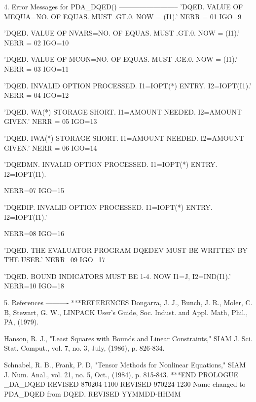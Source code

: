 \documentclass[11pt,twoside,nolof]{starlink}
\begin{document}
\begin{terminalv}
  4. Error Messages for PDA_DQED()
     --------------------------
   'DQED. VALUE OF MEQUA=NO. OF EQUAS. MUST .GT.0. NOW = (I1).'
   NERR = 01
   IGO=9

  'DQED. VALUE OF NVARS=NO. OF EQUAS. MUST .GT.0. NOW = (I1).'
   NERR = 02
   IGO=10

  'DQED. VALUE OF MCON=NO. OF EQUAS. MUST .GE.0. NOW = (I1).'
   NERR = 03
   IGO=11

  'DQED. INVALID OPTION PROCESSED. I1=IOPT(*) ENTRY.   I2=IOPT(I1).'
   NERR = 04
   IGO=12

  'DQED. WA(*) STORAGE SHORT. I1=AMOUNT NEEDED. I2=AMOUNT GIVEN.'
   NERR = 05
   IGO=13

  'DQED. IWA(*) STORAGE SHORT. I1=AMOUNT NEEDED. I2=AMOUNT   GIVEN.'
   NERR = 06
   IGO=14

  'DQEDMN. INVALID OPTION PROCESSED. I1=IOPT(*) ENTRY.   I2=IOPT(I1).

   NERR=07
   IGO=15

  'DQEDIP. INVALID OPTION PROCESSED. I1=IOPT(*) ENTRY.  I2=IOPT(I1).'

   NERR=08
   IGO=16

  'DQED. THE EVALUATOR PROGRAM DQEDEV MUST BE WRITTEN BY THE  USER.'
   NERR=09
   IGO=17

  'DQED. BOUND INDICATORS MUST BE 1-4. NOW I1=J, I2=IND(I1).'
   NERR=10
   IGO=18

  5. References
     ----------
***REFERENCES
 Dongarra, J. J., Bunch, J. R., Moler, C. B, Stewart, G. W.,
 LINPACK User's Guide, Soc. Indust. and Appl. Math, Phil.,
  PA, (1979).

 Hanson, R. J., "Least Squares with Bounds and Linear
 Constraints," SIAM J. Sci. Stat. Comput., vol. 7, no. 3, July,
 (1986), p. 826-834.

 Schnabel, R. B., Frank, P. D, "Tensor Methods for Nonlinear
 Equations," SIAM J. Num. Anal., vol. 21, no. 5, Oct., (1984),
 p. 815-843.
***END PROLOGUE  _DA_DQED
     REVISED 870204-1100
     REVISED 970224-1230
        Name changed to PDA_DQED from DQED.
     REVISED YYMMDD-HHMM
\end{terminalv}



\end{document}
